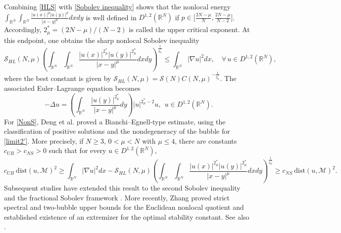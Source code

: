 \documentclass[11pt]{article}
\begin{document}
{Combining \eqref{HLS} with \eqref{Sobolev inequality} shows that the nonlocal energy} $\int_{\mathbb{R}^{N}}\int_{\mathbb{R}^{N}} \frac{|u(x)|^p|u(y)|^p}{|x-y|^\mu}dxdy$
is well defined in $D^{1,2}(\mathbb{R}^{N})$ if
$p\in\big[\frac{2N-\mu}{N},\frac{2N-\mu}{N-2}\big]$.
{Accordingly, $2^{\ast}_{\mu}=(2N-\mu)/(N-2)$ is called the upper critical exponent. At this endpoint, one obtains the sharp nonlocal Sobolev inequality}
\begin{equation}\label{NonS}
 \mathcal{S}_{HL}(N,\mu) \left(
\int_{\mathbb{R}^{N}}\int_{\mathbb{R}^{N}}
\frac{|u(x)|^{2^{\ast}_{\mu}}|u(y)|^{2^{\ast}_{\mu}}}{|x-y|^\mu}dxdy
\right)^{\frac{1}{2^{\ast}_{\mu}}}\leq \int_{\mathbb{R}^{N}}|\nabla u|^{2}d x,\quad \forall \, u\in D^{1,2}(\mathbb{R}^{N}),
\end{equation}
where the best constant is given by $\mathcal{S}_{HL}(N,\mu)=\mathcal{S}(N)C(N,\mu)^{-\frac{1}{2^{\ast}_{\mu}}}$.
The associated Euler--Lagrange equation becomes
\begin{equation}\label{limit2'}
 -\Delta u=\left(\int_{\mathbb{R}^{N}}\frac{|u(y)|
^{2^{\ast}_{\mu}}}{|x-y|^{\mu}}dy \right)|u|^{2^{\ast}_{\mu}-2}u,~~u\in D^{1,2}(\mathbb{R}^{N}).
\end{equation}
{For \eqref{NonS}, Deng et al. \cite{DTYZ23} proved a Bianchi--Egnell-type estimate, using the classification of positive solutions \cite{DY19,GHPS19} and the nondegeneracy of the bubble \cite{LLTX23} for \eqref{limit2'}. More precisely,}
if $N\geq3$, $0<\mu<N$ with
 $\mu\leq 4$, there are constants $c_{UB}>c_{NS}>0$ such that
 for every $u\in{D}^{1,2}(\mathbb{R}^{N})$,
\begin{equation*}
c_{UB} ~ \mathrm{dist}(u,\mathcal{M})^2\geq \int_{\mathbb{R}^{N}}|\nabla u|^{2}{d}x-\mathcal{S}_{HL}(N,\mu)\left(
\int_{\mathbb{R}^{N}}\int_{\mathbb{R}^{N}}
\frac{|u(x)|^{2^{\ast}_{\mu}}|u(y)|^{2^{\ast}_{\mu}}}{|x-y|^\mu}dxdy
\right)^{\frac{1}{2^{\ast}_{\mu}}}\geq c_{NS} ~ \mathrm{dist}(u,\mathcal{M})^2.
\end{equation*}
Subsequent studies have extended this result to the second Sobolev inequality \cite{YZ25} and the fractional Sobolev framework \cite{DLYZ25,LYZ25}.
More recently, Zhang \cite{Z26} proved strict spectral and two-bubble upper bounds for the Euclidean nonlocal quotient and established existence of an extremizer for the optimal stability constant. See also \cite{DT25}.
\end{document}
